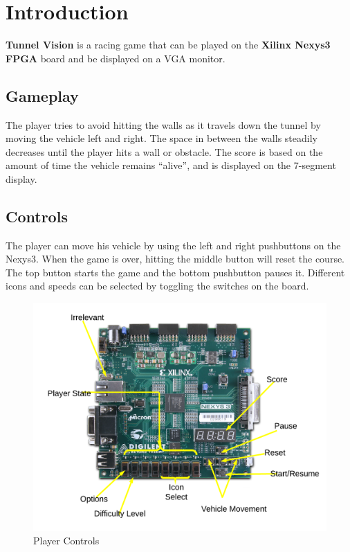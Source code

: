\documentclass[11pt]{article}
\begin{document}


\section{Introduction} 
\textbf{Tunnel Vision} is a racing game that can be played on the \textbf{Xilinx Nexys3 FPGA} board and be displayed on a VGA monitor.

\subsection{Gameplay}
The player tries to avoid hitting the walls as it travels down the tunnel by moving the vehicle left and right. The space in between the walls steadily decreases until the player hits a wall or obstacle. The score is based on the amount of time the vehicle remains ``alive'', and is displayed on the 7-segment display.

\subsection{Controls}
The player can move his vehicle by using the left and right pushbuttons on the Nexys3. When the game is over, hitting the middle button will reset the course. The top button starts the game and the bottom pushbutton pauses it. Different icons and speeds can be selected by toggling the switches on the board.

		\begin{figure}[h]\centering
		\includegraphics[height=0.8\textwidth, width=0.8\textheight]{Images/controls_mockup.png}
		\caption{Player Controls}
			\label{controls}
		\end{figure}	
	 	
\end{document}
